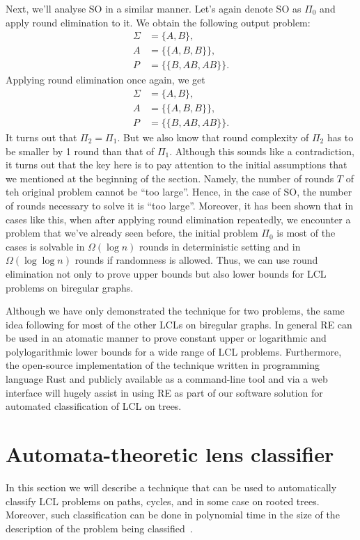Next, we'll analyse SO in a similar manner. Let's again denote SO as $\Pi_0$ and apply
round elimination to it. We obtain the following output problem:
\begin{align*}
\Sigma &= \{A, B\}, \\
A &= \{ \{A, B, B\} \}, \\
P &= \{ \{B, AB, AB\}\}.
\end{align*}
Applying round elimination once again, we get
\begin{align*}
\Sigma &= \{A, B\}, \\
A &= \{ \{A, B, B\} \}, \\
P &= \{ \{B, AB, AB\}\}.
\end{align*}
It turns out that $\Pi_2 = \Pi_1$. But we also know that round complexity of $\Pi_2$
has to be smaller by 1 round than that of $\Pi_1$. Although this sounds like a contradiction,
it turns out that the key here is to pay attention to the initial assumptions that we mentioned at the
beginning of the section. Namely, the number of rounds $T$ of teh original problem cannot be ``too large''.
Hence, in the case of SO, the number of rounds necessary to solve it is ``too large''. Moreover,
it has been shown that in cases like this, when after applying round elimination repeatedly,
we encounter a problem that we've already seen before, the initial problem $\Pi_0$ is most of the cases
is solvable in $\Omega(\log n)$ rounds in deterministic setting and in $\Omega(\log \log n)$ rounds
if randomness is allowed. Thus, we can use round elimination not only to prove upper bounds but
also lower bounds for LCL problems on biregular graphs.

Although we have only demonstrated the technique for two problems, the same idea following for most of the
other LCLs on biregular graphs. In general RE can be used in an atomatic manner to prove constant upper or
logarithmic and polylogarithmic lower bounds for a wide range of LCL problems. Furthermore, the open-source
implementation
of the technique written in programming language Rust and publicly available as a command-line tool and via
a web interface will hugely assist in using RE as part of our software solution for automated classification
of LCL on trees.

\section{Automata-theoretic lens classifier}

In this section we will describe a technique that can be used to automatically
classify LCL problems on paths, cycles, and in some case on rooted trees.
Moreover, such classification can be done in polynomial time in the size
of the description of the problem being classified~\cite{Chang2020}.

